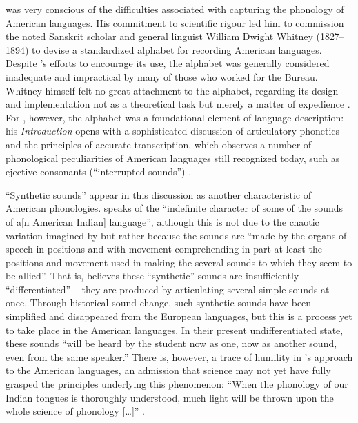 \documentclass[output=paper]{langscibook}
\begin{document}
{\Powell} was very conscious of the difficulties associated with capturing the phonology of American languages. His commitment to scientific rigour led him to commission the noted Sanskrit scholar and general linguist William Dwight Whitney (1827--1894) to devise a standardized alphabet for recording American languages. Despite {\Powell}'s efforts to encourage its use, the alphabet was generally considered inadequate and impractical by many of those who worked for the Bureau. Whitney himself felt no great attachment to the alphabet, regarding its design and implementation not as a theoretical task but merely a matter of expedience \citep[see][50--51]{Darnell1998}. For {\Powell}, however, the alphabet was a foundational element of language description: his \emph{Introduction} opens with a sophisticated discussion of articulatory phonetics and the principles of accurate transcription, which observes a number of phonological peculiarities of American languages still recognized today, such as ejective consonants (``interrupted sounds'') \citep[1--16]{Powell18801877}.

``Synthetic sounds'' appear in this discussion as another characteristic of American phonologies. \citet[12]{Powell18801877} speaks of the ``indefinite character of some of the sounds of a[n American Indian] language'', although this is not due to the chaotic variation imagined by {\Brinton} but rather because the sounds are ``made by the organs of speech in positions and with movement comprehending in part at least the positions and movement used in making the several sounds to which they seem to be allied''. That is, {\Powell} believes these ``synthetic'' sounds are insufficiently ``differentiated'' -- they are produced by articulating several simple sounds at once. Through historical sound change, such synthetic sounds have been simplified and disappeared from the European languages, but this is a process yet to take place in the American languages. In their present undifferentiated state, these sounds ``will be heard by the student now as one, now as another sound, even from the same speaker.'' There is, however, a trace of humility in {\Powell}'s approach to the American languages, an admission that science may not yet have fully grasped the principles underlying this phenomenon: ``When the phonology of our Indian tongues is thoroughly understood, much light will be thrown upon the whole science of phonology […]'' \citep[13]{Powell18801877}.
\end{document}

